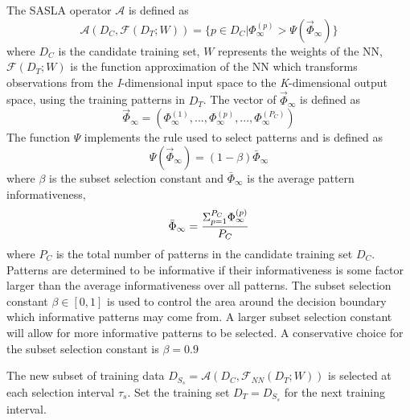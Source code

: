 \documentclass[conference]{IEEEtran}
\begin{document}
	The SASLA operator $\mathcal{A}$ is defined as 
	$$
	\mathcal{A}(D_C, \mathcal{F}(D_T;W)) = \{p\in D_C | \Phi_\infty^{(p)}>\Psi(\vec\Phi_\infty)\}
	$$
	where $D_C$ is the candidate training set, $W$ represents the weights of the NN, $\mathcal{F}(D_T;W)$ is the function approximation of the NN which transforms observations from the \textit{I}-dimensional input space to the \textit{K}-dimensional output space, using the training patterns in $D_T$. The vector of $\vec{\Phi}_\infty$ is defined as
	$$
	\vec{\Phi}_\infty = (\Phi_\infty^{(1)},...,\Phi_\infty^{(p)},...,\Phi_\infty^{(P_C)})
	$$
	The function $\Psi$ implements the rule used to select patterns and is defined as
	$$
	\Psi(\vec\Phi_\infty)=(1-\beta)\bar{\Phi}_\infty
	$$
	where $\beta$ is the subset selection constant and $\bar{\Phi}_\infty$ is the average pattern informativeness,
	$$
	\Bar{\Phi}_\infty = \frac{\Sigma_{p=1}^{P_C}\Phi_\infty^{(p)}}{P_C}
	$$
	where $P_C$ is the total number of patterns in the candidate training set $D_C$. Patterns are determined to be informative if their informativeness is some factor larger than the average informativeness over all patterns. The subset selection constant $\beta \in [0, 1]$ is used to control the area around the decision boundary which informative patterns may come from. A larger subset selection constant will allow for more informative patterns to be selected. A conservative choice for the subset selection constant is $\beta=0.9$
	
	The new subset of training data $D_{S_s} = 	\mathcal{A}(D_C, \mathcal{F}_{NN}(D_T;W))$ is selected at each selection interval $\tau_s$. Set the training set $D_T=D_{S_s}$ for the next training interval. 
	
\end{document}
